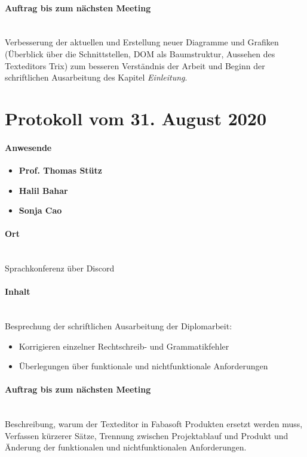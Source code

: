 \paragraph{Auftrag bis zum nächsten Meeting}\mbox{}\\
Verbesserung der aktuellen und Erstellung neuer Diagramme und Grafiken (Überblick über die Schnittstellen, DOM als Baumstruktur, Aussehen des Texteditors Trix) zum besseren Verständnis der Arbeit und Beginn der schriftlichen Ausarbeitung des Kapitel {\em{Einleitung}}.

\section{Protokoll vom 31. August 2020}

\paragraph{Anwesende}
\begin{itemize}
	\item{\textbf{Prof. Thomas Stütz}}
	\item{\textbf{Halil Bahar}}
	\item{\textbf{Sonja Cao}}
\end{itemize}

\paragraph{Ort}\mbox{}\\
Sprachkonferenz über Discord

\paragraph{Inhalt}\mbox{}\\
Besprechung der schriftlichen Ausarbeitung der Diplomarbeit:
\begin{itemize}
	\item{Korrigieren einzelner Rechtschreib- und Grammatikfehler}
	\item{Überlegungen über funktionale und nichtfunktionale Anforderungen}
\end{itemize}

\paragraph{Auftrag bis zum nächsten Meeting}\mbox{}\\
Beschreibung, warum der Texteditor in Fabasoft Produkten ersetzt werden muss, Verfassen kürzerer Sätze, Trennung zwischen Projektablauf und Produkt und Änderung der funktionalen und nichtfunktionalen Anforderungen.

